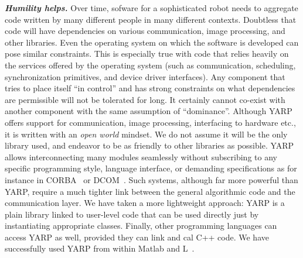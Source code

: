 \textit{\textbf{Humility helps.}}
Over time, sofware for a sophisticated robot needs to 
aggregate code written by many different people in many
different contexts.  Doubtless that code will have
dependencies on various communication, image processing,
and other libraries. Even the operating system on which
the software is developed can pose similar constraints. This is especially
true with code that relies heavily on the services offered by the 
operating system (such as communication, scheduling, synchronization primitives, 
and device driver interfaces).
%
Any component that tries to place itself ``in control'' and has strong
constraints on what dependencies are permissible will not be tolerated
for long.  It certainly cannot co-exist with another component
with the same assumption of ``dominance''. 
Although YARP offers support for communication, image processing,
interfacing to hardware etc., it is written with an {\em open world}
mindset.  We do not assume it will be the only library used, and
endeavor to be as friendly to other libraries as possible.
%
YARP allows interconnecting many modules seamlessly without subscribing
to any specific programming style, language interface, 
or demanding specifications as for instance in CORBA~\cite{vinoski97corba}
or DCOM~\cite{dcom}. Such systems, although far more powerful than YARP,
require a much tighter link between the general algorithmic code and the 
communication layer.
We have taken a more lightweight approach: YARP is a plain library linked
to user-level code that can be used directly just by instantiating appropriate classes.
%
%
%
%
%
%
%
%
Finally, other programming languages can access YARP as well, provided they
can link and cal C++ code. We have successfully used
YARP from within Matlab and L~\cite{brooks90behavior}.



